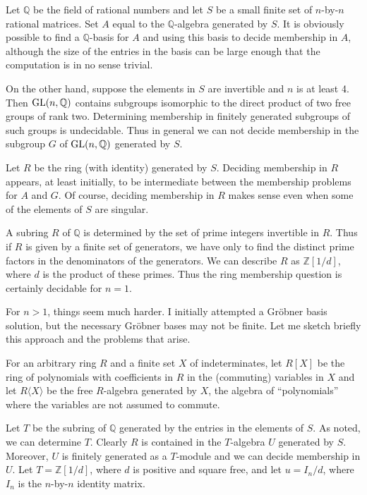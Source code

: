 \documentclass[12pt]{article}
\def\gl{{\rm GL}}
\def\Z{{\mathbb Z}}
\def\Q{{\mathbb Q}}
\begin{document}
Let $\Q$ be the field of rational numbers and let $S$ be a small finite
set of $n$-by-$n$ rational matrices. Set $A$ equal to the
$\Q$-algebra generated by $S$.  It is obviously possible to find a
$\Q$-basis for $A$ and using this basis to decide membership in $A$,
although the size of the entries in the basis can be large enough that
the computation is in no sense trivial.

On the other hand, suppose the elements in $S$ are invertible and $n$
is at least 4.  Then $\gl(n,\Q)$ contains subgroups isomorphic to the
direct product of two free groups of rank two.  Determining membership
in finitely generated subgroups of such groups is undecidable.  Thus
in general we can not decide membership in the subgroup $G$ of
$\gl(n,\Q)$ generated by $S$.

Let $R$ be the ring (with identity) generated by $S$.  Deciding
membership in $R$ appears, at least initially, to be intermediate
between the membership problems for $A$ and $G$.  Of course, deciding
membership in $R$ makes sense even when some of the elements of $S$
are singular.

A subring $R$ of $\Q$ is determined by the set of prime integers
invertible in $R$.  Thus if $R$ is given by a finite set of
generators, we have only to find the distinct prime factors in the
denominators of the generators.  We can describe $R$ as $\Z[1/d]$,
where $d$ is the product of these primes.  Thus the ring membership
question is certainly decidable for $n=1$.

For $n>1$, things seem much harder.  I initially attempted a Gr\"obner
basis solution, but the necessary Gr\"obner bases may not be finite.
Let me sketch briefly this approach and the problems that arise.

For an arbitrary ring $R$ and a finite set $X$ of indeterminates, let
$R[X]$ be the ring of polynomials with coefficients in $R$ in the
(commuting) variables in $X$ and let $R\langle X\rangle$ be the free
$R$-algebra generated by $X$, the algebra of ``polynomials'' where the
variables are not assumed to commute.

Let $T$ be the subring of $\Q$ generated by the entries in the
elements of $S$.  As noted, we can determine $T$.  Clearly $R$ is
contained in the $T$-algebra $U$ generated by $S$.  Moreover, $U$ is
finitely generated as a $T$-module and we can decide membership in $U$.
Let $T= \Z[1/d]$, where $d$ is positive and square free, and let $u =
I_n/d$, where $I_n$ is the $n$-by-$n$ identity matrix.
\end{document}
